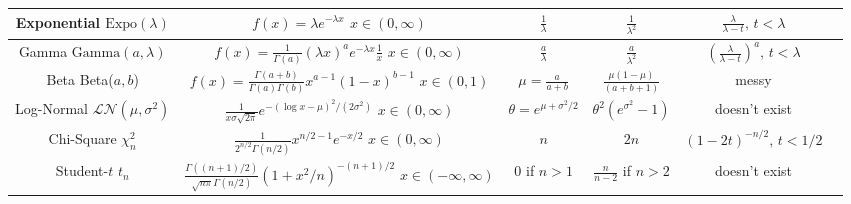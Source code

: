 \documentclass[6pt,landscape]{article}
\newcommand{\Beta}{\textrm{Beta}}
\newcommand{\Gam}{\textrm{Gamma}}
\newcommand{\Expo}{\textrm{Expo}}
\begin{document}
\begin{center}
\begin{tabular}{cccccc}
\hline
\shortstack{Exponential \\ $\Expo(\lambda)$} & \shortstack{$f(x) = \lambda e^{-\lambda x}$\\$ x \in (0, \infty)$} & $\frac{1}{\lambda}$  & $\frac{1}{\lambda^2}$ & $\frac{\lambda}{\lambda - t}, \, t < \lambda$\\
\hline
\shortstack{Gamma \\ $\Gam(a, \lambda)$} & \shortstack{$f(x) = \frac{1}{\Gamma(a)}(\lambda x)^ae^{-\lambda x}\frac{1}{x}$\\$ x \in (0, \infty)$} & $\frac{a}{\lambda}$  & $\frac{a}{\lambda^2}$ & $\left(\frac{\lambda}{\lambda - t}\right)^a, \, t < \lambda$\\
\hline
\shortstack{Beta \\ \Beta($a, b$)} & \shortstack{$f(x) = \frac{\Gamma(a+b)}{\Gamma(a)\Gamma(b)}x^{a-1}(1-x)^{b-1}$\\$x \in (0, 1) $} & $\mu = \frac{a}{a + b}$  & $\frac{\mu(1-\mu)}{(a + b + 1)}$ & messy \\
\hline
\shortstack{Log-Normal \\ $\mathcal{LN}(\mu,\sigma^2)$} & \shortstack{$\frac{1}{x\sigma \sqrt{2\pi}}e^{-(\log x - \mu)^2/(2\sigma^2)}$\\$x \in (0, \infty)$} & $\theta = e^{ \mu + \sigma^2/2}$ & $\theta^2 (e^{\sigma^2} - 1)$ & doesn't exist\\
\hline
\shortstack{Chi-Square \\ $\chi_n^2$} & \shortstack{$\frac{1}{2^{n/2}\Gamma(n/2)}x^{n/2 - 1}e^{-x/2}$\\$x \in (0, \infty) $} & $n$  & $2n$ & $(1 - 2t)^{-n/2}, \, t < 1/2$\\
\hline
\shortstack{Student-$t$ \\ $t_n$} & \shortstack{$\frac{\Gamma((n+1)/2)}{\sqrt{n\pi} \Gamma(n/2)} (1+x^2/n)^{-(n+1)/2}$\\$x \in (-\infty, \infty)$} & $0$ if $n>1$ & $\frac{n}{n-2}$ if $n>2$ & doesn't exist\\
\hline
\end{tabular}
\end{center}
\end{document}
